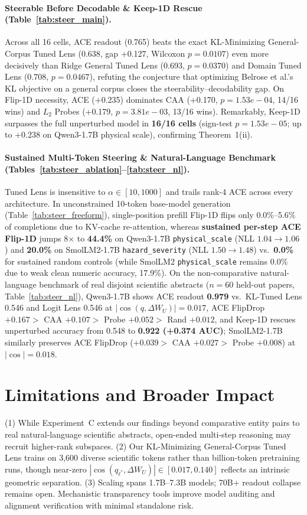 \documentclass[10pt]{article}
\begin{document}
\paragraph{Steerable Before Decodable \& Keep-1D Rescue (Table~\ref{tab:steer_main}).} Across all 16 cells, ACE readout (0.765) beats the exact KL-Minimizing General-Corpus Tuned Lens (0.638, gap +0.127, Wilcoxon $p=0.0107$) even more decisively than Ridge General Tuned Lens (0.693, $p=0.0370$) and Domain Tuned Lens (0.708, $p=0.0467$), refuting the conjecture that optimizing Belrose et al.'s KL objective on a general corpus closes the steerability--decodability gap. On Flip-1D necessity, ACE (+0.235) dominates CAA (+0.170, $p=1.53e-04$, 14/16 wins) and $L_2$ Probes (+0.179, $p=3.81e-03$, 13/16 wins). Remarkably, Keep-1D surpasses the full unperturbed model in \textbf{16/16 cells} (sign-test $p=1.53e-05$; up to +0.238 on Qwen3-1.7B physical scale), confirming Theorem~1(ii).

\paragraph{Sustained Multi-Token Steering \& Natural-Language Benchmark (Tables~\ref{tab:steer_ablation}--\ref{tab:steer_nl}).} Tuned Lens is insensitive to $\alpha \in [10, 1000]$ and trails rank-4 ACE across every architecture. In unconstrained 10-token base-model generation (Table~\ref{tab:steer_freeform}), single-position prefill Flip-1D flips only 0.0\%--5.6\% of completions due to KV-cache re-attention, whereas \textbf{sustained per-step ACE Flip-1D} jumps 8$\times$ to \textbf{44.4\%} on Qwen3-1.7B \texttt{physical\_scale} (NLL $1.04 \to 1.06$) and \textbf{20.0\%} on SmolLM2-1.7B \texttt{hazard\_severity} (NLL $1.50 \to 1.48$) vs.\ \textbf{0.0\%} for sustained random controls (while SmolLM2 \texttt{physical\_scale} remains 0.0\% due to weak clean numeric accuracy, 17.9\%). On the non-comparative natural-language benchmark of real disjoint scientific abstracts ($n=60$ held-out papers, Table~\ref{tab:steer_nl}), Qwen3-1.7B shows ACE readout \textbf{0.979} vs.\ KL-Tuned Lens 0.546 and Logit Lens 0.546 at $|\cos(q,\Delta W_U)|=0.017$, ACE FlipDrop $+0.167 >$ CAA $+0.107 >$ Probe $+0.052 >$ Rand $+0.012$, and Keep-1D rescues unperturbed accuracy from 0.548 to \textbf{0.922 (+0.374 AUC)}; SmolLM2-1.7B similarly preserves ACE FlipDrop ($+0.039 >$ CAA $+0.027 >$ Probe $+0.008$) at $|\cos|=0.018$.

\section{Limitations and Broader Impact}
(1) While Experiment~C extends our findings beyond comparative entity pairs to real natural-language scientific abstracts, open-ended multi-step reasoning may recruit higher-rank subspaces. (2) Our KL-Minimizing General-Corpus Tuned Lens trains on 3,600 diverse scientific tokens rather than billion-token pretraining runs, though near-zero $|\cos(q_{\ell^*}, \Delta W_U)| \in [0.017, 0.140]$ reflects an intrinsic geometric separation. (3) Scaling spans 1.7B--7.3B models; 70B+ readout collapse remains open. Mechanistic transparency tools improve model auditing and alignment verification with minimal standalone risk.



\end{document}

